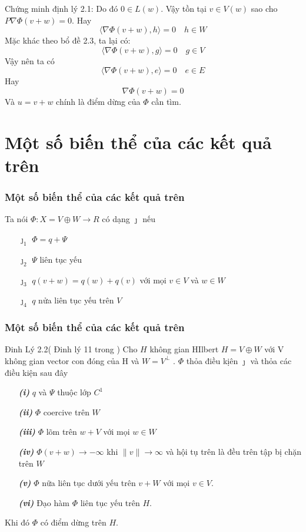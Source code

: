 \documentclass{beamer}
\begin{document}
\begin{frame}
\begin{block}{Chứng minh định lý 2.1:}
Do đó $0\in L(w)$. Vậy tồn tại $v \in V(w)$ sao cho $P \nabla \Phi(v+w)=0$. Hay
\[\langle \nabla \Phi (v+w) ,h \rangle =0 \quad h \in W\]
Mặc khác theo bổ đề 2.3, ta lại có:
\[\langle \nabla \Phi (v+w) ,g \rangle =0 \quad g \in V\]
Vậy nên ta có
\[\langle \nabla \Phi (v+w) ,e \rangle =0 \quad e \in E\]
Hay \[\nabla \Phi (v+w)=0\]
Và $u=v+w$ chính là điểm dừng của $\Phi$ cần tìm.
\end{block}

\end{frame}

\section{Một số biến thể của các kết quả trên}

\begin{frame}
\frametitle{Một số biến thể của các kết quả trên}
\noindent Ta nói $\Phi : X =V \oplus W \rightarrow R$ có dạng $ \jmath$ nếu
\begin{itemize}
\item[$\jmath_1$ ] $\Phi =q +\Psi$
\item[$\jmath_2$ ] $\Psi$ liên tục yếu
\item[$\jmath_3$ ] $q(v+w)=q(w)+q(v)$ với mọi $v \in V$ và $w \in W$ 
\item[$\jmath_4$ ]   $q$ nửa liên tục yếu trên $V$
\end{itemize}
\end{frame}



\begin{frame}
\frametitle{Một số biến thể của các kết quả trên}
\begin{block}{Đinh Lý 2.2( Đinh lý 11 trong \cite{YJMM})}
Cho $H$ không gian HIlbert $H=V \oplus W$ với V không gian vector con đóng của H và $W = V^{\perp}$ . $\Phi$ thỏa điều kịên $ \jmath$  và thỏa các điều kiện sau đây
\begin{itemize}
\item[\textbf{\textit{(i)}}]  $q$ và $\Psi$ thuộc lớp $C^1$
\item[\textbf{\textit{(ii)}}]  $\Phi$ coercive trên $W$
\item[\textbf{\textit{(iii)}}]  $\Phi$ lõm trên $w+V$ với mọi $w \in W$
\item[\textbf{\textit{(iv)}}]  $\Phi(v+w) \rightarrow -\infty$ khi $\|v\| \rightarrow \infty $ và hội tụ trên là đều trên tập bị chặn trên $W$
\item[\textbf{\textit{(v)}}] $\Phi$ nữa liên tục dưới yếu trên $v+W$ với mọi $v \in V$.
\item[\textbf{\textit{(vi)}}]  Đạo hàm $\Phi$ liên tục yếu trên $H$.
\end{itemize}
Khi đó  $\Phi$ có điểm  dừng trên $H$.
\end{block}
\end{frame}
\end{document}
